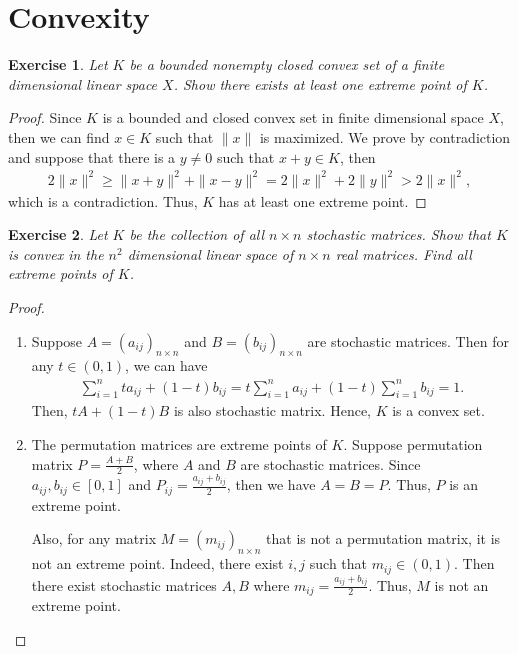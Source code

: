 \documentclass[11pt]{book}
\newtheorem{exercise}{Exercise}[section]
\theoremstyle{definition}
\numberwithin{equation}{chapter}
\begin{document}
\section{Convexity}

\begin{exercise}
Let $K$ be a bounded nonempty closed convex set of a finite dimensional linear space $X$. Show there exists at least one extreme point of $K$.
\end{exercise}
\begin{proof}
Since $K$ is a bounded and closed convex set in finite dimensional space $X$, then we can find $x\in K$ such that $\|x\|$ is maximized. We prove by contradiction and suppose that there is a $y\neq 0$ such that $x+y \in K$, then 
\begin{align*}
    2\|x\|^2 \geq \|x+y\|^2 + \|x-y\|^2 = 2\|x\|^2 + 2\|y\|^2 > 2\|x\|^2,
\end{align*}
which is a contradiction. Thus, $K$ has at least one extreme point.
\end{proof}

\medskip

\begin{exercise}
Let $K$ be the collection of all $n\times n$ stochastic matrices. Show that $K$ is convex in the $n^2$ dimensional linear space of $n\times n$ real matrices. Find all extreme points of $K$.
\end{exercise}
\begin{proof}
~\begin{enumerate}[label=(\arabic*)]
    \item Suppose $A = \left(a_{ij}\right)_{n\times n}$ and $B = \left(b_{ij}\right)_{n\times n}$ are stochastic matrices. Then for any $t\in (0,1)$, we can have 
    \begin{align*}
        \sum^n_{i=1} t a_{ij} + (1-t)b_{ij} = t \sum^n_{i=1} a_{ij} + (1-t) \sum^n_{i=1} b_{ij} = 1.
    \end{align*}
    Then, $tA + (1-t) B$ is also stochastic matrix. Hence, $K$ is a convex set.
    
    \item The permutation matrices are extreme points of $K$. Suppose permutation matrix $P = \frac{A + B}{2}$, where $A$ and $B$ are stochastic matrices. Since $a_{ij}, b_{ij} \in [0,1]$ and $P_{ij} = \frac{a_{ij} + b_{ij}}{2}$, then we have $A = B = P$. Thus, $P$ is an extreme point. 
    
    Also, for any matrix $M = \left(m_{ij}\right)_{n\times n}$ that is not a permutation matrix, it is not an extreme point. Indeed, there exist $i, j$ such that $m_{ij} \in (0,1)$. Then there exist stochastic matrices $A, B$ where $m_{ij} = \frac{a_{ij} + b_{ij}}{2}$. Thus, $M$ is not an extreme point.
\end{enumerate}
\end{proof}
\end{document}

